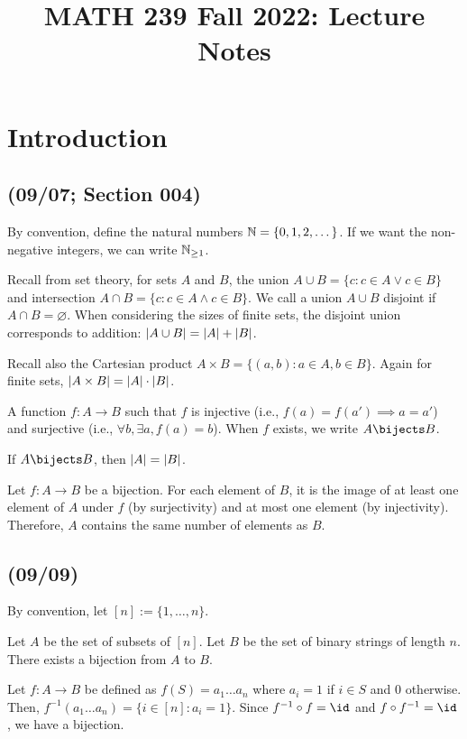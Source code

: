 \documentclass[class=math239,notes]{agony}
\title{MATH 239 Fall 2022: Lecture Notes}
\begin{document}
\thispagestyle{firstpage}
\tableofcontents

\pagebreak
\chapter{Introduction}

\section{(09/07; Section 004)}

By convention, define the natural numbers $\mathbb{N} = \{0,1,2,\dotsc\}$.
If we want the non-negative integers, we can write $\mathbb{N}_{\geq1}$.

Recall from set theory, for sets $A$ and $B$,
the union $A \cup B = \{c : c \in A \lor c \in B\}$
and intersection $A \cap B = \{c : c \in A \land c \in B\}$.
We call a union $A \cup B$ disjoint if $A \cap B = \varnothing$.
When considering the sizes of finite sets,
the disjoint union corresponds to addition:
$\abs{A \cup B} = \abs{A} + \abs{B}$.

Recall also the Cartesian product $A \times B = \{(a,b) : a \in A, b \in B\}$.
Again for finite sets, $\abs{A \times B} = \abs{A} \cdot \abs{B}$.

\begin{defn}[bijection]
  A function $f : A \to B$ such that $f$ is injective (i.e., $f(a) = f(a') \implies a = a'$)
  and surjective (i.e., $\forall b, \exists a, f(a) = b$).
  When $f$ exists, we write $A \bijects B$.
\end{defn}

\begin{theorem}
  If $A \bijects B$, then $\abs{A} = \abs{B}$.
\end{theorem}
\begin{prf}
  Let $f : A \to B$ be a bijection.
  For each element of $B$, it is the image of
  at least one element of $A$ under $f$ (by surjectivity)
  and at most one element (by injectivity).
  Therefore, $A$ contains the same number of elements as $B$.
\end{prf}

\section{(09/09)}

By convention, let $[n] := \{1,\dotsc,n\}$.

\begin{theorem}
  Let $A$ be the set of subsets of $[n]$.
  Let $B$ be the set of binary strings of length $n$.
  There exists a bijection from $A$ to $B$.
\end{theorem}
\begin{prf}
  Let $f : A \to B$ be defined as $f(S) = a_1\dots a_n$
  where $a_i = 1$ if $i \in S$ and $0$ otherwise.
  Then, $f^{-1}(a_1\dots a_n) = \{i \in [n] : a_i = 1\}$.
  Since $f^{-1} \circ f = \id$ and $f \circ f^{-1} = \id$, we have a bijection.
\end{prf}
\end{document}
